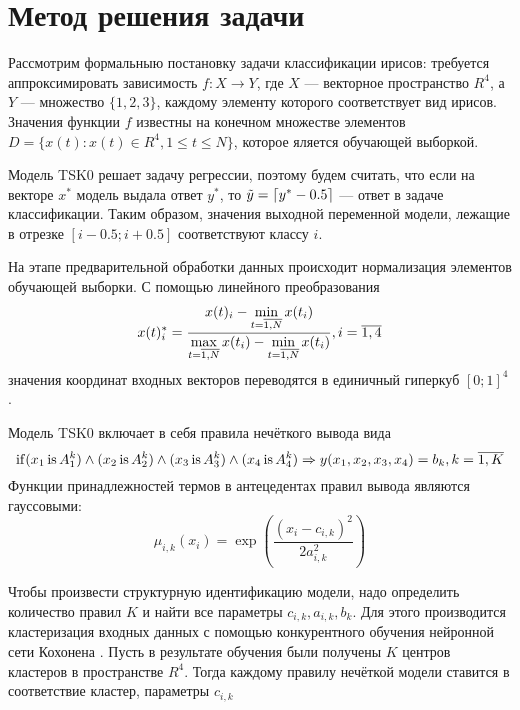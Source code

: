 \section{Метод решения задачи}
Рассмотрим формальныю постановку задачи классификации ирисов: требуется аппроксимировать зависимость
\(f :X \rightarrow Y\),
где \(X\) --- векторное пространство \(R^4\), а \(Y\) --- множество \(\{1,2,3\}\),
каждому элементу которого соответствует вид ирисов. Значения функции \(f\) известны
на конечном множестве элементов \(D=\{x(t):x(t)\in R^4, 1 \leqslant t \leqslant N\}\),
которое яляется обучающей выборкой.
\par
Модель TSK0 решает задачу регрессии, поэтому будем считать, что если на векторе \(x^*\)
модель выдала ответ \(y^*\), то \(\tilde y = \lceil y^*-0.5\rceil\) --- ответ в задаче классификации.
Таким образом, значения выходной переменной модели, лежащие в отрезке \([i-0.5;i+0.5]\)
соответствуют классу \(i\).
\par
На этапе предварительной обработки данных происходит нормализация элементов обучающей выборки.
С помощью линейного преобразования
\begin{displaymath}
x(t)_i^* = \frac{\displaystyle x(t)_i - \min_{t=\overline{1,N}} x(t_i)}{ \\*
\displaystyle \max_{t=\overline{1,N}} x(t_i)-\min_{t=\overline{1,N}} x(t_i)}
,i=\overline{1,4}
\end{displaymath}
значения координат входных векторов переводятся в единичный гиперкуб \([0;1]^4\).
\par
Модель TSK0 включает в себя правила нечёткого вывода вида
\begin{displaymath}
\operatorname{if}(x_1 \operatorname{is} A_1^k) \land (x_2 \operatorname{is} A_2^k) \land (x_3 \operatorname{is} A_3^k) \land (x_4 \operatorname{is} A_4^k)\Rightarrow y(x_1,x_2,x_3,x_4)=b_k,
k=\overline{1,K}
\end{displaymath}
Функции принадлежностей термов в антецедентах правил вывода являются гауссовыми:
\begin{displaymath}
\mu_{i,k}(x_i)=\exp \left( \frac{(x_i-c_{i,k})^2}{2a_{i,k}^2} \right)
\end{displaymath}
\par
Чтобы произвести структурную идентификацию модели, надо определить количество правил \(K\) и
найти все параметры \(c_{i,k},a_{i,k},b_k\). Для этого производится кластеризация
входных данных с помощью конкурентного обучения нейронной сети Кохонена \cite{neuralNetworks}.
Пусть в результате обучения были получены \(K\) центров кластеров в пространстве \(R^4\).
Тогда каждому правилу нечёткой модели ставится в соответствие кластер, параметры \(c_{i,k}\)
